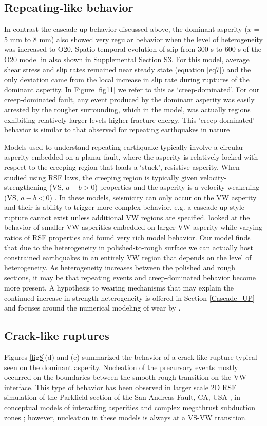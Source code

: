 \documentclass[preprint,1p, 10pt,authoryear]{elsarticle}
\begin{document}
\subsection{Repeating-like behavior}
In contrast the cascade-up behavior discussed above, the dominant asperity ($x$ = 5 mm to 8 mm) also showed very regular behavior when the level of heterogeneity was increased to O20.  Spatio-temporal evolution of slip from 300 s to 600 s of the O20 model in also shown in Supplemental Section S3. For this model, average shear stress and slip rates remained near steady state (equation \eqref{eq7}) and the only deviation came from the local increase in slip rate during ruptures of the dominant asperity.  In Figure \ref{fig11} we refer to this as `creep-dominated'. For our creep-dominated fault, any event produced by the dominant asperity was easily arrested by the rougher surrounding, which in the model, was actually regions exhibiting relatively larger levels higher fracture energy.  This 'creep-dominated' behavior is similar to that observed for repeating earthquakes in nature \citep[e.g., ][]{Beeler2001,Uchida2019}

Models used to understand repeating earthquake typically involve a circular asperity embedded on a planar fault, where the asperity is relatively locked with respect to the creeping region that loads a `stuck', resistive asperity. When studied using RSF laws, the creeping region is typically given velocity-strengthening (VS, $a-b>0$) properties and the asperity is a velocity-weakening  (VS, $a-b<0$) \citep{Kato2003,Chen2009}. In these models, seismicity can only occur on the VW asperity and their is ability to trigger more complex behavior, e.g. a cascade-up style rupture cannot exist unless additional VW regions are specified. \citet{Noda2013} looked at the behavior of smaller VW asperities embedded on larger VW asperity while varying ratios of RSF properties and found very rich model behavior. Our model finds that due to the heterogeneity in polished-to-rough surface we can actually host constrained earthquakes in an entirely VW region that depends on the level of heterogeneity.  As heterogeneity increases between the polished and rough sections, it may be that repeating events and creep-dominated behavior become more present.  A hypothesis to wearing mechanisms that may explain the continued increase in strength heterogeneity is offered in Section \ref{Cascade_UP} and focuses around the numerical modeling of wear by \citet{Aghababaei2016}.

\subsection{Crack-like ruptures}
Figures \ref{fig8}(d) and  (e) summarized the behavior of a crack-like rupture typical seen on the dominant asperity. Nucleation of the precursory events mostly occurred on the boundaries between the smooth-rough transition on the VW interface. This type of behavior has been observed in larger scale 2D RSF simulation of the Parkfield section of the San Andreas Fault, CA, USA \citep{Barbot2012}, in conceptual models of interacting asperities \citep{Kato2003} and complex megathrust subduction zones \citep{Kaneko2010}; however, nucleation in these models is always at a VS-VW transition. 
\end{document}
